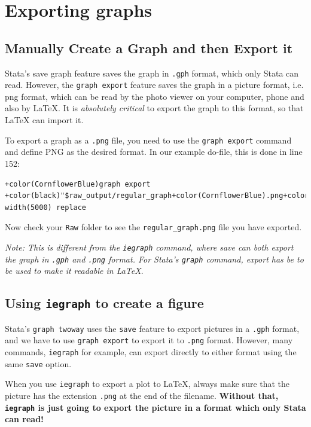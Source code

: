 \documentclass[]{article}
\begin{document}
 
\section{Exporting graphs}
\subsection{Manually Create a Graph and then Export it}

 Stata's save graph feature saves the graph in \texttt{.gph} format, which only Stata can read. However, the \texttt{graph export} feature  saves the graph in a picture format, i.e. png format, which can be read by the photo viewer on your computer, phone and also by {\LaTeX}. It is \emph{absolutely critical} to export the graph to this format, so that {\LaTeX} can import it.

To export a graph as a \texttt{.png} file, you need to use the \texttt{graph export} command and define PNG as the desired format. In our example do-file, this is done in line 152: 

	\begin{Verbatim}[commandchars=+\(\)]
	+color(CornflowerBlue)graph export +color(black)"$raw_output/regular_graph+color(CornflowerBlue).png+color(black)", width(5000) replace
	\end{Verbatim}

Now check your \texttt{Raw} folder to see the \texttt{regular\_graph.png} file you have exported.

\begin{center}
\textit{Note: This is different from the \texttt{iegraph} command, where save can both export the graph in \texttt{.gph} and \texttt{.png} format. For Stata's \texttt{graph} command, export has be to be used to make it readable in {\LaTeX}}.
\end{center}	
 

\subsection{Using \texttt{iegraph} to create a figure}

Stata's \texttt{graph twoway} uses the \texttt{save} feature to export pictures in a \texttt{.gph} format, and we have to use \texttt{graph export} to export it to \texttt{.png} format. However, many commands, \texttt{iegraph} for example, can export directly to either format using the same \texttt{save} option. 

When you use \texttt{iegraph} to export a plot to {\LaTeX}, always make sure that the picture has the extension \texttt{.png} at the end of the filename. \textbf{Without that, \texttt{iegraph} is just going to export the picture in a format which only Stata can read!}
\end{document}
